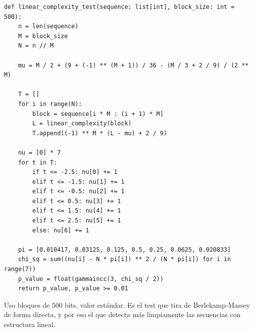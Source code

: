 \begin{lstlisting}[style=Python,caption={Test de complejidad lineal (extracto, \texttt{src/tests\_nist/linear\_complexity.py}).}]
def linear_complexity_test(sequence: list[int], block_size: int = 500):
    n = len(sequence)
    M = block_size
    N = n // M

    mu = M / 2 + (9 + (-1) ** (M + 1)) / 36 - (M / 3 + 2 / 9) / (2 ** M)

    T = []
    for i in range(N):
        block = sequence[i * M : (i + 1) * M]
        L = linear_complexity(block)
        T.append((-1) ** M * (L - mu) + 2 / 9)

    nu = [0] * 7
    for t in T:
        if t <= -2.5: nu[0] += 1
        elif t <= -1.5: nu[1] += 1
        elif t <= -0.5: nu[2] += 1
        elif t <= 0.5: nu[3] += 1
        elif t <= 1.5: nu[4] += 1
        elif t <= 2.5: nu[5] += 1
        else: nu[6] += 1

    pi = [0.010417, 0.03125, 0.125, 0.5, 0.25, 0.0625, 0.020833]
    chi_sq = sum((nu[i] - N * pi[i]) ** 2 / (N * pi[i]) for i in range(7))
    p_value = float(gammaincc(3, chi_sq / 2))
    return p_value, p_value >= 0.01
\end{lstlisting}

Uso bloques de 500 bits, valor estándar. Es el test que tira de Berlekamp-Massey de forma directa,
y por eso el que detecta más limpiamente las secuencias con estructura lineal.
